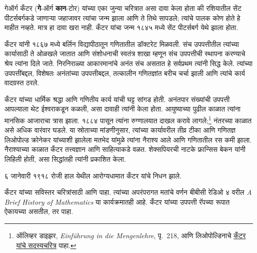 \documentclass[../../../include/open-logic-section]{subfiles}
\begin{document}



गेऑर्ग कँटर (\textbf{गे}-ऑर्ग \textbf{कान}-टोर) यांच्या एका जुन्या चरित्रात असा दावा केला होता की रशियातील सेंट पीटर्सबर्गकडे जाणाऱ्या जहाजावर त्यांचा जन्म झाला आणि ते तिथे सापडले; त्यांचे पालक कोण होते हे माहीत नव्हते. मात्र हा दावा खरा नाही. कँटर यांचा जन्म १८४५ मध्ये सेंट पीटर्सबर्ग येथे झाला होता.

कँटर यांनी १८६७ मध्ये बर्लिन विद्यापीठातून गणितातील डॉक्टरेट मिळवली. संच उपपत्तीतील त्यांच्या कार्यासाठी ते ओळखले जातात आणि संशोधनाची स्वतंत्र शाखा म्हणून संच उपपत्तीची स्थापना करण्याचे श्रेय त्यांना दिले जाते. निरनिराळ्या आकारमानांचे अनंत संच असतात हे सर्वप्रथम त्यांनी सिद्ध केले. त्यांच्या उपपत्तींबद्दल, विशेषतः अनंतांच्या उपपत्तीबद्दल, तत्कालीन गणितज्ञांत बरीच चर्चा झाली आणि त्यांचे कार्य वादग्रस्त ठरले.

कँटर यांच्या धार्मिक श्रद्धा आणि गणितीय कार्य यांची घट्ट सांगड होती. अनंतपार संख्यांची उपपत्ती आपल्याला थेट ईश्वराकडून कळली, असा दावाही त्यांनी केला होता. आयुष्याच्या पुढील काळात त्यांना मानसिक आजाराचा त्रास झाला. १८८४ पासून त्यांना रुग्णालयात दाखल करावे लागले;\footnote{ऑलिव्हर डाइझर, \emph{Einführung in die Mengenlehre}, पृ.~218, आणि लिओपोल्डिनाचे \href{https://www.leopoldina.org/en/members/member-list/detail/georg-cantor}{कँटर यांचे सदस्यचरित्र} पाहा.} नंतरच्या काळात असे अधिक वारंवार घडले. या स्रोताच्या मांडणीनुसार, त्यांच्या कार्यावरील तीव्र टीका आणि गणितज्ञ लिओपोल्ड क्रोनेकर यांच्याशी झालेला मतभेद यांमुळे त्यांना नैराश्य आले आणि गणितातील रस कमी झाला. नैराश्याच्या काळात कँटर तत्त्वज्ञान आणि साहित्याकडे वळत. शेक्सपियरची नाटके फ्रान्सिस बेकन यांनी लिहिली होती, असा सिद्धांतही त्यांनी प्रकाशित केला.

६ जानेवारी १९१८ रोजी हाल येथील आरोग्यधामात कँटर यांचे निधन झाले.

\begin{reading}
कँटर यांच्या सविस्तर चरित्रांसाठी \citet{Dauben1990} आणि \citet{Grattan-Guinness1971} पाहा. त्यांच्या अपरंपरागत मतांचे वर्णन बीबीसी रेडिओ ४ वरील \emph{A Brief History of Mathematics} \citep{Sautoy2014} या कार्यक्रमातही आहे. कँटर यांच्या उपपत्ती रॅपच्या रूपात ऐकायच्या असतील, तर \citet{Rose2012} पाहा.
\end{reading}
\end{document}

